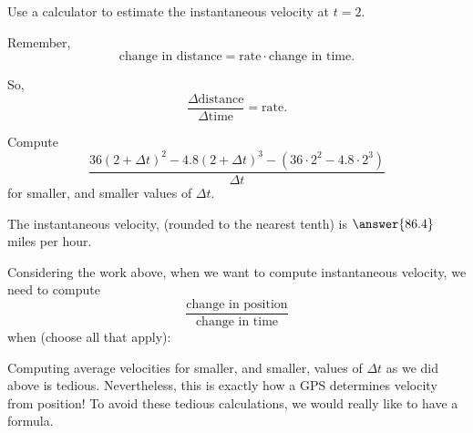 \documentclass{ximera}
\begin{document}
\begin{problem}
  Use a calculator to estimate the instantaneous velocity at $t=2$.
  \begin{hint}
    Remember, 
    \[
    \text{change in distance} = \text{rate}\cdot\text{change in time}.
    \]
  \end{hint}
  \begin{hint}
    So, 
    \[
    \frac{\Delta\text{distance}}{\Delta\text{time}} = \text{rate}.
    \]
  \end{hint}
  \begin{hint}
    Compute
    \[
    \frac{36(2+\Delta t)^2 -4.8(2+\Delta t)^3 -\left(36\cdot 2^2 -4.8\cdot 2^3\right) }{\Delta t}
    \]
    for smaller, and smaller values of $\Delta t$.
  \end{hint}
  \begin{prompt}
    The instantaneous velocity, (rounded to the nearest tenth) is $\answer{86.4}$ miles per hour.
  \end{prompt}
\end{problem}


\begin{problem}
  Considering the work above, when we want to compute instantaneous
  velocity, we need to compute
  \[
  \frac{\text{change in position}}{\text{change in time}}
  \]
  when (choose all that apply):
 \begin{selectAll}
 \end{selectAll}
\end{problem}


Computing average velocities for smaller, and smaller, values of
$\Delta t$ as we did above is tedious. Nevertheless, this is exactly
how a GPS determines velocity from position! To avoid these tedious
calculations, we would really like to have a formula.


%
\end{document}
